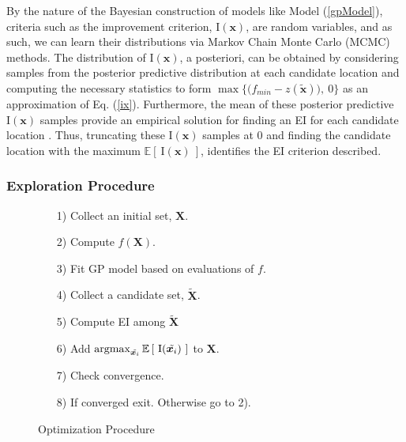 \documentclass[12pt]{article}
\newcommand{\E}[1]{
        \mathbb{E}\left[~#1~\right]
}
\newcommand{\argmax}{\operatornamewithlimits{argmax}}
\def \Eix {
	\mathbb{E}\left[~\text{I}(\bm{x})~\right]
}
\def \ix {
	\text{I}(\bm{x})
}
\begin{document}
	By the nature of the Bayesian construction of models like Model (\ref{gpModel}), criteria such as the improvement criterion, $\ix$, are random variables, and as such, we can learn their distributions via Markov Chain Monte Carlo (MCMC) methods.
	The distribution of $\ix$, a posteriori, can be obtained by considering samples from the posterior predictive distribution at each candidate location and computing the necessary statistics to form $\max \Big\{ \big(f_{min} - z(\tilde{\bm{x}})\big), ~0 \Big\}$ as an approximation of Eq. (\ref{ix}).  
	Furthermore, the mean of these posterior predictive $\ix$ samples provide an empirical solution for finding an EI for each candidate location \cite{tgp2}.
	Thus, truncating these $\ix$ samples at 0 and finding the candidate location with the maximum $\Eix$, identifies the EI criterion described.

        \subsubsection{Exploration Procedure}
        
	\begin{wrapfigure}{r}{0.5\textwidth}
	\vspace{-1.6cm}
	\singlespacing
	\caption{Optimization Procedure}
	\begin{itemize}
	\item[1)] Collect an initial set, $\bm{X}$.
	\item[2)] Compute $f(\bm{X})$.
	\item[3)] Fit GP model based on evaluations of $f$.
	\item[4)] Collect a candidate set, $\tilde{\bm{X}}$.
	\item[5)] Compute EI among $\tilde{\bm{X}}$
	\item[6)] Add $\argmax_{\tilde{\bm{x}_i}} \E{\text{I}(\tilde{\bm{x}_i})}$ to $\bm{X}$.
	\item[7)] Check convergence.
	\item[8)] If converged exit. Otherwise go to 2).
	\end{itemize}
	\doublespacing
	\label{procedure}
	\end{wrapfigure}
	
\end{document}
